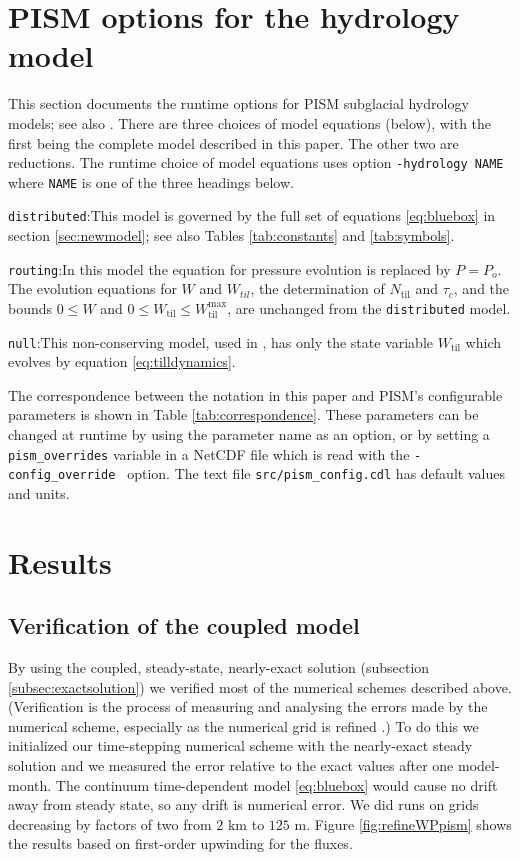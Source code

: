 \documentclass[gmd]{copernicus}   %
\newcommand{\text}{\textrm}
\newcommand{\Ntil}{N_{\text{til}}}
\newcommand{\Wtil}{W_{\text{til}}}
\newcommand{\Wtilmax}{W_{\text{til}}^{\text{max}}}
\begin{document}
\section{PISM options for the hydrology model} \label{sec:pismdoc}

This section documents the runtime options for PISM subglacial hydrology models; see also \citep{pism-user-manual}.  There are three choices of model equations (below), with the first being the complete model described in this paper.  The other two are reductions.  The runtime choice of model equations uses option \texttt{-hydrology NAME} where \texttt{NAME} is one of the three headings below.

\medskip
\noindent \texttt{distributed}:\quad  This model is governed by the full set of equations \eqref{eq:bluebox} in section \ref{sec:newmodel}; see also Tables \ref{tab:constants} and \ref{tab:symbols}.

\medskip
\noindent \texttt{routing}:\quad  In this model the equation for pressure evolution is replaced by $P = P_o$.  The evolution equations for $W$ and $W_{til}$, the determination of $\Ntil$ and $\tau_c$, and the bounds $0\le W$ and $0\le \Wtil \le \Wtilmax$, are unchanged from the \texttt{distributed} model.

\medskip
\noindent \texttt{null}:\quad  This non-conserving model, used in \citep{BBssasliding}, has only the state variable $\Wtil$ which evolves by equation \eqref{eq:tilldynamics}.

\medskip
The correspondence between the notation in this paper and PISM's configurable parameters is shown in Table \ref{tab:correspondence}.  These parameters can be changed at runtime by using the parameter name as an option, or by setting a \verb|pism_overrides| variable in a NetCDF file which is read with the \verb|-config_override | option.  The text file \verb|src/pism_config.cdl| has default values and units.


\section{Results}  \label{sec:results}

\subsection{Verification of the coupled model}  By using the coupled, steady-state, nearly-exact solution (subsection \ref{subsec:exactsolution}) we verified most of the numerical schemes described above.  (Verification is the process of measuring and analysing the errors made by the numerical scheme, especially as the numerical grid is refined \citep{Wesseling}.)  To do this we initialized our time-stepping numerical scheme with the nearly-exact steady solution and we measured the error relative to the exact values after one model-month.  The continuum time-dependent model \eqref{eq:bluebox} would cause no drift away from steady state, so any drift is numerical error.  We did runs on grids decreasing by factors of two from $2$ km to $125$ m.  Figure \ref{fig:refineWPpism} shows the results based on first-order upwinding for the fluxes.
\end{document}
